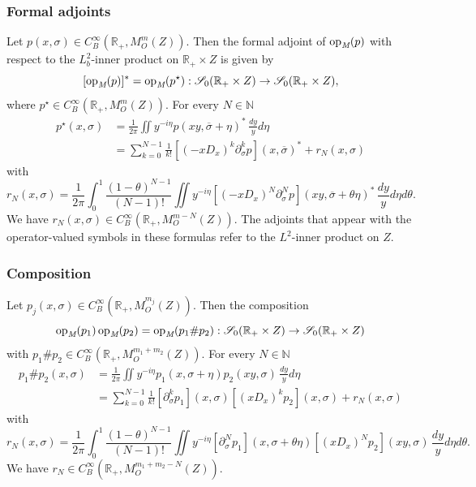 \documentclass[reqno]{amsart}
\numberwithin{equation}{section}
\theoremstyle{definition}
\def\N{\mathbb N}
\def\R{\mathbb R}
\def\S{\mathscr S}
\def\opm{\textup{op}_{\textit{M}}}
\begin{document}
\subsubsection*{Formal adjoints}

Let $p(x,\sigma) \in C^{\infty}_B(\R_+,M^{m}_O(Z))$. Then the formal adjoint of $\opm(p)$ with respect to the $L^2_b$-inner product on $\R_+\times Z$ is given by
$$
[\opm(p)]^* = \opm(p^{\star}) : \S_0(\R_+ \times Z) \to \S_0(\R_+ \times Z),
$$
where $p^{\star} \in C^{\infty}_B(\R_+,M^{m}_O(Z))$. For every $N \in \N$
\begin{equation}\label{MelAdjoint}
\begin{aligned}
p^{\star}(x,\sigma) &= \frac{1}{2\pi}\iint y^{-i\eta}p(xy,\overline{\sigma}+\eta)^*\,\frac{dy}{y}d\eta \\
&= \sum\limits_{k=0}^{N-1}\frac{1}{k!} [(-xD_x)^k\partial_{\sigma}^kp](x,\overline{\sigma})^* + r_N(x,\sigma)
\end{aligned}
\end{equation}
with
\begin{equation}\label{MelAdjointRem}
r_N(x,\sigma) = \frac{1}{2\pi}\!\int_0^1\frac{(1-\theta)^{N-1}}{(N-1)!}\iint y^{-i\eta}[(-xD_x)^{N}\partial_{\sigma}^Np](xy,\overline{\sigma}+\theta\eta)^*\,\frac{dy}{y}d\eta d\theta.
\end{equation}
We have $r_N(x,\sigma) \in C^{\infty}_B(\R_+,M^{m-N}_O(Z))$. The adjoints that appear with the operator-valued symbols in these formulas refer to the $L^2$-inner product on $Z$.

\subsubsection*{Composition}

Let $p_j(x,\sigma) \in C^{\infty}_B(\R_+,M^{m_j}_O(Z))$. Then the composition
$$
\opm(p_1) \, \opm(p_2) = \opm(p_1{\#}p_2) : \S_0(\R_+ \times Z) \to \S_0(\R_+ \times Z)
$$
with $p_1{\#}p_2 \in C^{\infty}_B(\R_+,M^{m_1+m_2}_O(Z))$. For every $N \in \N$
\begin{equation}\label{MelLeibniz}
\begin{aligned}
p_1{\#}p_2(x,\sigma) &= \frac{1}{2\pi}\iint y^{-i\eta}p_1(x,\sigma+\eta)p_2(xy,\sigma)\,\frac{dy}{y}d\eta \\
&= \sum\limits_{k=0}^{N-1}\frac{1}{k!}[\partial_{\sigma}^kp_1](x,\sigma)[(xD_x)^kp_2](x,\sigma) + r_N(x,\sigma)
\end{aligned}
\end{equation}
with
\begin{equation}\label{MelLeibnizRem}
r_N(x,\sigma) = \frac{1}{2\pi}\!\int_0^1\!\frac{(1-\theta)^{N-1}}{(N-1)!}\iint y^{-i\eta}[\partial_{\sigma}^Np_1](x,\sigma+\theta\eta)[(xD_{x})^Np_2](xy,\sigma)\,\frac{dy}{y}d\eta d\theta.
\end{equation}
We have $r_N \in C^{\infty}_B(\R_+,M^{m_1+m_2-N}_O(Z))$.
\end{document}
